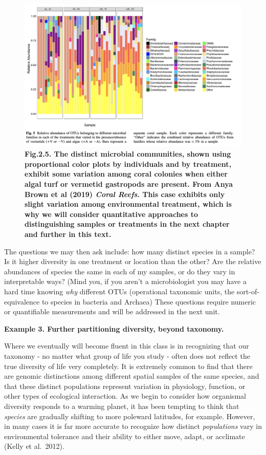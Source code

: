 \documentclass[
]{article}
\begin{document}
\begin{figure}
\centering
\includegraphics{MEImages/Brown2019Fig5.jpg}
\caption{\textbf{Fig.2.5. The distinct microbial communities, shown
using proportional color plots by individuals and by treatment, exhibit
some variation among coral colonies when either algal turf or vermetid
gastropods are present. From Anya Brown et al (2019) \emph{Coral Reefs}.
This case exhibits only slight variation among environmental treatment,
which is why we will consider quantitative approaches to distinguishing
samples or treatments in the next chapter and further in this text.}}
\end{figure}

The questions we may then ask include: how many distinct species in a
sample? Is it higher diversity in one treatment or location than the
other? Are the relative abundances of species the same in each of my
samples, or do they vary in interpretable ways? (Mind you, if you aren't
a microbiologist you may have a hard time knowing \emph{why} different
OTUs (operational taxonomic units, the sort-of-equivalence to species in
bacteria and Archaea) These questions require numeric or quantifiable
measurements and will be addressed in the next unit.

\textbf{Example 3. Further partitioning diversity, beyond taxonomy.}

Where we eventually will become fluent in this class is in recognizing
that our taxonomy - no matter what group of life you study - often does
not reflect the true diversity of life very completely. It is extremely
common to find that there are genomic distinctions among different
spatial samples of the same species, and that these distinct populations
represent variation in physiology, function, or other types of
ecological interaction. As we begin to consider how organismal diversity
responds to a warming planet, it has been tempting to think that
\emph{species} are gradually shifting to more poleward latitudes, for
example. However, in many cases it is far more accurate to recognize how
distinct \emph{populations} vary in environmental tolerance and their
ability to either move, adapt, or acclimate (Kelly et al.~2012).
\end{document}

